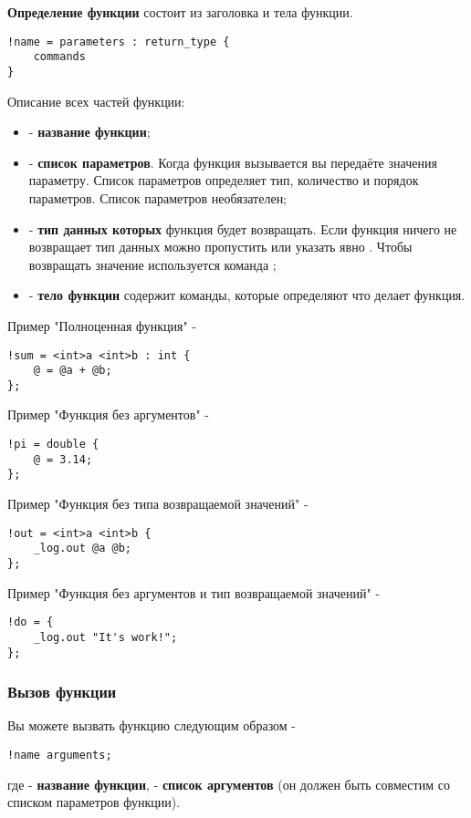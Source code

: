 \documentclass[a4paper, 14pt]{extarticle}
\newenvironment{icItems}
	{ \begin{itemize} [noitemsep,nolistsep] }
	{ \end{itemize} }
\begin{document}
{\bf Определение функции} состоит из заголовка и тела функции.

\begin{lstlisting}[numbers=none]
!name = parameters : return_type {
	commands
}
\end{lstlisting}

Описание всех частей функции:
\begin{icItems}
\item
	 - {\bf название функции};
\item
	 - {\bf список параметров}. Когда функция вызывается вы передаёте значения параметру. Список параметров определяет тип, количество и порядок параметров. Список параметров необязателен;
\item
	 - {\bf тип данных которых} функция будет возвращать. Если функция ничего не возвращает тип данных можно пропустить или указать явно \void. Чтобы возвращать значение используется команда ;
\item
	 - {\bf тело функции} содержит команды, которые определяют что делает функция.
\end{icItems}

\noindent Пример "Полноценная функция" -
\begin{lstlisting}
!sum = <int>a <int>b : int {
	@ = @a + @b;
};
\end{lstlisting}

\noindent Пример "Функция без аргументов" -
\begin{lstlisting}
!pi = double {
	@ = 3.14;
};
\end{lstlisting}

\noindent Пример "Функция без типа возвращаемой значений" -
\begin{lstlisting}
!out = <int>a <int>b {
	_log.out @a @b;
};
\end{lstlisting}

\noindent Пример "Функция без аргументов и тип возвращаемой значений" -
\begin{lstlisting}
!do = {
	_log.out "It's work!";
};
\end{lstlisting}

\subsubsection{Вызов функции}

Вы можете вызвать функцию следующим образом -
\begin{lstlisting}[numbers=none]
!name arguments;
\end{lstlisting}
где  - {\bf название функции},  - {\bf список аргументов} (он должен быть совместим со списком параметров функции).
\end{document}

